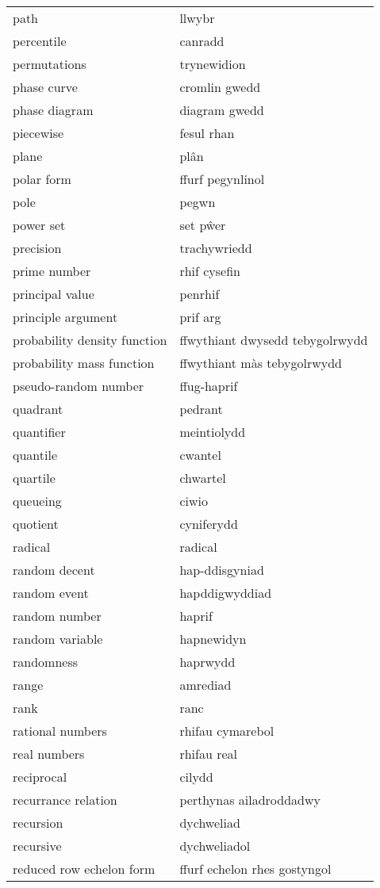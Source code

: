 \begin{supertabular}{p{0.22\textwidth}p{0.22\textwidth}}
path & llwybr \\
percentile & canradd \\
permutations & trynewidion \\
phase curve & cromlin gwedd \\
phase diagram & diagram gwedd \\
piecewise & fesul rhan \\
plane & plân \\
polar form & ffurf pegynlinol \\
pole & pegwn \\
power set & set pŵer \\
precision & trachywriedd \\
prime number & rhif cysefin \\
principal value & penrhif \\
principle argument & prif arg \\
probability density function & ffwythiant dwysedd tebygolrwydd \\
probability mass function & ffwythiant màs tebygolrwydd \\
pseudo-random number & ffug-haprif \\
quadrant & pedrant \\
quantifier & meintiolydd \\
quantile & cwantel \\
quartile & chwartel \\
queueing & ciwio \\
quotient & cyniferydd \\
radical & radical \\
random decent & hap-ddisgyniad \\
random event & hapddigwyddiad \\
random number & haprif \\
random variable & hapnewidyn \\
randomness & haprwydd \\
range & amrediad \\
rank & ranc \\
rational numbers & rhifau cymarebol \\
real numbers & rhifau real \\
reciprocal & cilydd \\
recurrance relation & perthynas ailadroddadwy \\
recursion & dychweliad \\
recursive & dychweliadol \\
reduced row echelon form & ffurf echelon rhes gostyngol \\

\end{supertabular}
